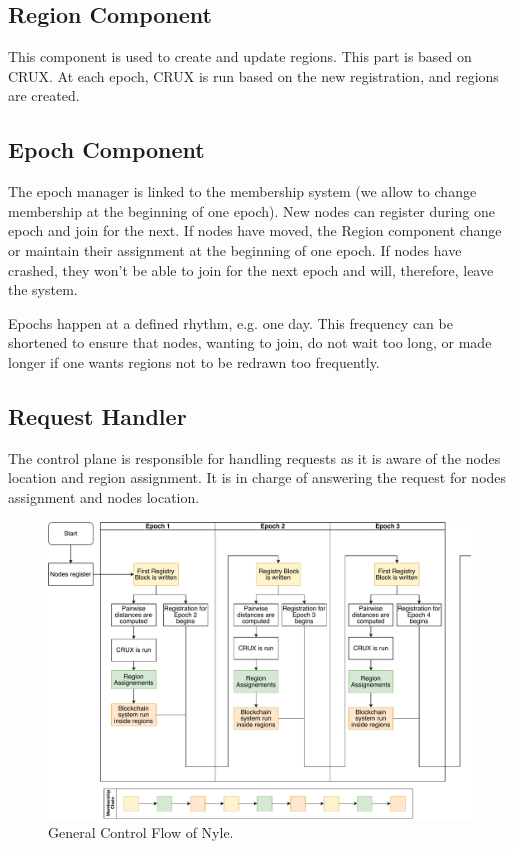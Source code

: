\documentclass[a4paper,11pt,twoside=semi,openright]{report}
\begin{document}
\subsection{Region Component} This component is used to create and update
regions. This part is based on CRUX. At each epoch, CRUX is run based on
the new registration, and regions are created.
 
\subsection{Epoch Component} The epoch manager is linked to the membership
system (we allow to change membership at the beginning of one epoch). New nodes
can register during one epoch and join for the next. If nodes have moved, the
Region component change or maintain their assignment at the beginning of one
epoch. If nodes have crashed, they won't be able to join for the next epoch and
will, therefore, leave the system.

Epochs happen at a defined rhythm, e.g. one day. This frequency can be
shortened to ensure that nodes, wanting to join, do not wait too long, or made
longer if one wants regions not to be redrawn too frequently. 

\subsection{Request Handler} The control plane is responsible for handling
requests as it is aware of the nodes location and region assignment. It is
in charge of answering the request for nodes assignment and nodes location. 

\begin{figure}[!h] 
\includegraphics[width=450pt]{figures/Nyle_controlflow}
\caption{General Control Flow of Nyle. }
\label{fig:controlflow}
\end{figure}
\end{document}
